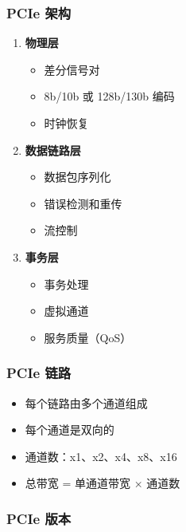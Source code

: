 \subsubsection{PCIe 架构}

\begin{enumerate}
  \item \textbf{物理层}
    \begin{itemize}
      \item 差分信号对
      \item 8b/10b 或 128b/130b 编码
      \item 时钟恢复
    \end{itemize}

  \item \textbf{数据链路层}
    \begin{itemize}
      \item 数据包序列化
      \item 错误检测和重传
      \item 流控制
    \end{itemize}

  \item \textbf{事务层}
    \begin{itemize}
      \item 事务处理
      \item 虚拟通道
      \item 服务质量（QoS）
    \end{itemize}
\end{enumerate}

\subsubsection{PCIe 链路}

\begin{itemize}
  \item 每个链路由多个通道组成
  \item 每个通道是双向的
  \item 通道数：x1、x2、x4、x8、x16
  \item 总带宽 = 单通道带宽 × 通道数
\end{itemize}

\subsubsection{PCIe 版本}

